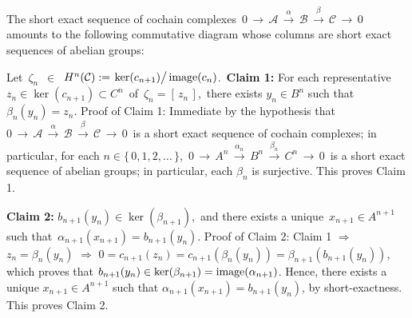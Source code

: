 \proof
The short exact sequence of cochain complexes
\,$0 \,\longrightarrow\, \mathcal{A} \,\overset{\alpha}{\longrightarrow}\, \mathcal{B} \,\overset{\beta}{\longrightarrow}\, \mathcal{C} \,\longrightarrow\, 0$\,
amounts to the following commutative diagram
whose columns are short exact sequences of
abelian groups:
\begin{center}
\end{center}
\vskip 0.25cm
\noindent
Let \,$\zeta_{n}$\, 
$\in$
\,$H^{n}(\mathcal{C}) := \left.\ker(\overset{{\color{white}.}}{c_{n+1}})\right/\image(c_{n})$.\,
\vskip 0.25cm
\noindent
\textbf{Claim 1:}\;\;
For each representative
\,$z_{n} \in \ker(c_{n+1}) \subset C^{n}$\,
of
\,$\zeta_{n} = \left[\,z_{n}\,\right]$,\,
there exists $y_{n} \in B^{n}$
such that $\beta_{n}(y_{n}) = z_{n}$.
\vskip 0.2cm
\noindent
Proof of Claim 1:
Immediate by the hypothesis that
\,$0 \,\longrightarrow\, \mathcal{A} \,\overset{\alpha}{\longrightarrow}\, \mathcal{B} \,\overset{\beta}{\longrightarrow}\, \mathcal{C} \,\longrightarrow\,0$\,
is a short exact sequence of cochain complexes;
in particular, for each $n \in \{\,0,1,2,\ldots\,\}$,
\,$0 \,\longrightarrow\, A^{n} \,\overset{\alpha_{n}}{\longrightarrow}\, B^{n} \,\overset{\beta_{n}}{\longrightarrow}\, C^{n} \,\longrightarrow\,0$\,
is a short exact sequence of abelian groups;
in particular, each $\beta_{n}$ is surjective.
This proves Claim 1.

\vskip 0.5cm
\noindent
\textbf{Claim 2:}\;\;
$b_{n+1}(y_{n}) \in \ker(\beta_{n+1})$,\, and there exists a unique \,$x_{n+1} \in A^{n+1}$\,
such that \,$\alpha_{n+1}(x_{n+1}) = b_{n+1}(y_{n})$.
\vskip 0.2cm
\noindent
Proof of Claim 2:
Claim 1
\;$\Longrightarrow$\;
\,$z_{n} = \beta_{n}(y_{n})$
\;$\Longrightarrow$\;
$0 = c_{n+1}(z_{n}) = c_{n+1}(\beta_{n}(y_{n})) = \beta_{n+1}(b_{n+1}(y_{n}))$,
which proves that $b_{n+1}(y_{n}) \in \ker(\beta_{n+1}) = \textnormal{image}(\alpha_{n+1})$.
Hence, there exists a unique $x_{n+1} \in A^{n+1}$ such that
$\alpha_{n+1}(x_{n+1}) = b_{n+1}(y_{n})$, by short-exactness.
This proves Claim 2.

